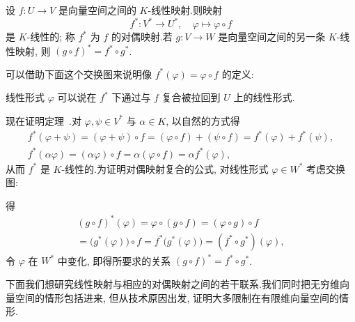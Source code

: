 \begin{theorem}\label{thm:2.3.2}
设 $f \colon U \longrightarrow V$ 是向量空间之间的 $K$-线性映射.则映射
\[
f^* \colon V^* \longrightarrow U^*, \quad \varphi \longmapsto \varphi \circ f
\]
是 $K$-线性的; 称 $f^*$ 为 $f$ 的对偶映射.若 $g \colon V \longrightarrow W$ 是向量空间之间的另一条 $K$-线性映射, 则 $(g \circ f)^* = f^* \circ g^*$.
\end{theorem}

可以借助下面这个交换图来说明像 $f^*(\varphi) = \varphi \circ f$ 的定义:
\begin{center}
\end{center}
线性形式 $\varphi$ 可以说在 $f^*$ 下通过与 $f$ 复合被拉回到 $U$ 上的线性形式.

现在证明定理~.对 $\varphi, \psi \in V^*$ 与 $\alpha \in K$, 以自然的方式得
\[
\begin{array}{c}
f^*(\varphi + \psi) = (\varphi + \psi) \circ f = (\varphi \circ f) + (\psi \circ f) = f^*(\varphi) + f^*(\psi), \\
f^*(\alpha\varphi) = (\alpha\varphi) \circ f = \alpha(\varphi \circ f) = \alpha f^*(\varphi),
\end{array}
\]
从而 $f^*$ 是 $K$-线性的.为证明对偶映射复合的公式, 对线性形式 $\varphi \in W^*$ 考虑交换图:
\begin{center}
\end{center}
得
\[
\begin{array}{c}
(g \circ f)^*(\varphi) = \varphi \circ (g \circ f) = (\varphi \circ g) \circ f \\
= \big(g^*(\varphi)\big) \circ f = f^*\big(g^*(\varphi)\big) = (f^* \circ g^*)(\varphi),
\end{array}
\]
令 $\varphi$ 在 $W^*$ 中变化, 即得所要求的关系 $(g \circ f)^* = f^* \circ g^*$.

下面我们想研究线性映射与相应的对偶映射之间的若干联系.我们同时把无穷维向量空间的情形包括进来, 但从技术原因出发, 证明大多限制在有限维向量空间的情形.

